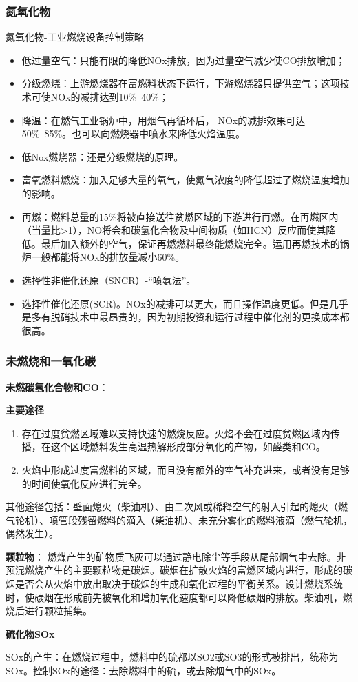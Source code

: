 \subsubsection{氮氧化物}
氮氧化物-工业燃烧设备控制策略
\begin{itemize}
    \item 低过量空气：只能有限的降低NOx排放，因为过量空气减少使CO排放增加；
    \item 分级燃烧：上游燃烧器在富燃料状态下运行，下游燃烧器只提供空气；这项技术可使NOx的减排达到10\%~40\%；
    \item 降温：在燃气工业锅炉中，用烟气再循环后， NOx的减排效果可达50\%~85\%。也可以向燃烧器中喷水来降低火焰温度。
    \item 低Nox燃烧器：还是分级燃烧的原理。
    \item 富氧燃料燃烧：加入足够大量的氧气，使氮气浓度的降低超过了燃烧温度增加的影响。
    \item 再燃：燃料总量的15\%将被直接送往贫燃区域的下游进行再燃。在再燃区内（当量比>1），NO将会和碳氢化合物及中间物质（如HCN）反应而使其降低。最后加入额外的空气，保证再燃燃料最终能燃烧完全。运用再燃技术的锅炉一般都能将NOx的排放量减小60\%。
    \item 选择性非催化还原（SNCR）-“喷氨法”。
    \item 选择性催化还原(SCR)。NOx的减排可以更大，而且操作温度更低。但是几乎是多有脱硝技术中最昂贵的，因为初期投资和运行过程中催化剂的更换成本都很高。
\end{itemize}

\subsubsection{未燃烧和一氧化碳}
\textbf{未燃碳氢化合物和CO}：

\textbf{主要途径}
\begin{enumerate}
    \item 存在过度贫燃区域难以支持快速的燃烧反应。火焰不会在过度贫燃区域内传播，在这个区域燃料发生高温热解形成部分氧化的产物，如醛类和CO。
    \item 火焰中形成过度富燃料的区域，而且没有额外的空气补充进来，或者没有足够的时间使氧化反应进行完全。
\end{enumerate}
其他途径包括：壁面熄火（柴油机）、由二次风或稀释空气的射入引起的熄火（燃气轮机）、喷管段残留燃料的滴入（柴油机）、未充分雾化的燃料液滴（燃气轮机，偶然发生）。

\textbf{颗粒物}：
燃煤产生的矿物质飞灰可以通过静电除尘等手段从尾部烟气中去除。非预混燃烧产生的主要颗粒物是碳烟。碳烟在扩散火焰的富燃区域内进行，形成的碳烟是否会从火焰中放出取决于碳烟的生成和氧化过程的平衡关系。设计燃烧系统时，使碳烟在形成前先被氧化和增加氧化速度都可以降低碳烟的排放。柴油机，燃烧后进行颗粒捕集。

\textbf{硫化物SOx}

SOx的产生：在燃烧过程中，燃料中的硫都以SO2或SO3的形式被排出，统称为SOx。控制SOx的途径：去除燃料中的硫，或去除烟气中的SOx。